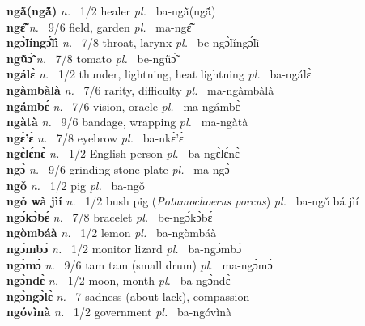 \noindent
{\bfseries ngã̀(ngã̀́)}  {\itshape n.~} 1/2 healer {\itshape pl.~} ba-ngã̀(ngã́)    \\ 
{\bfseries ngɛ̃̂}  {\itshape n.~} 9/6 field, garden {\itshape pl.~} ma-ngɛ̃̂    \\ 
{\bfseries ngɔ̃̀língɔ̃̂́lì}  {\itshape n.~} 7/8 throat, larynx {\itshape pl.~} be-ngɔ̃̀língɔ̃́lì    \\ 
{\bfseries ngũ̀ɔ̃̀}  {\itshape n.~} 7/8 tomato {\itshape pl.~} be-ngũ̀ɔ̃̀    \\ 
{\bfseries ngálɛ̀}  {\itshape n.~} 1/2 thunder, lightning, heat lightning {\itshape pl.~} ba-ngálɛ̀    \\ 
{\bfseries  ngàmbàlà}  {\itshape n.~} 7/6 rarity, difficulty {\itshape pl.~} ma-ngàmbàlà    \\ 
{\bfseries ngámbɛ́}  {\itshape n.~} 7/6 vision, oracle {\itshape pl.~} ma-ngámbɛ̀    \\ 
{\bfseries ngàtà}  {\itshape n.~} 9/6 bandage, wrapping  {\itshape pl.~} ma-ngàtà    \\ 
{\bfseries ngɛ̀'ɛ̀}  {\itshape n.~} 7/8 eyebrow {\itshape pl.~} ba-nkɛ̀'ɛ̀    \\ 
{\bfseries ngɛ̀lɛ́nɛ̀}  {\itshape n.~} 1/2 English person {\itshape pl.~} ba-ngɛ̀lɛ́nɛ̀    \\ 
{\bfseries ngɔ̀}  {\itshape n.~} 9/6 grinding stone plate {\itshape pl.~} ma-ngɔ̀    \\ 
{\bfseries ngǒ}  {\itshape n.~} 1/2 pig {\itshape pl.~} ba-ngǒ    \\ 
{\bfseries ngǒ wà jìí}  {\itshape n.~} 1/2 bush pig ({\itshape Potamochoerus porcus}) {\itshape pl.~} ba-ngǒ bá jìí    \\ 
{\bfseries ngɔ́kɔ̀bɛ́}  {\itshape n.~} 7/8 bracelet {\itshape pl.~} be-ngɔ́kɔ̀bɛ́    \\ 
{\bfseries ngòmbáà}  {\itshape n.~} 1/2 lemon {\itshape pl.~} ba-ngòmbáà    \\ 
{\bfseries ngɔ̀mbɔ̀}  {\itshape n.~} 1/2 monitor lizard {\itshape pl.~} ba-ngɔ̀mbɔ̀    \\ 
{\bfseries ngɔ̀mɔ̀}  {\itshape n.~} 9/6 tam tam (small drum) {\itshape pl.~} ma-ngɔ̀mɔ̀    \\ 
{\bfseries ngɔ̀ndɛ̀}  {\itshape n.~} 1/2 moon, month {\itshape pl.~} ba-ngɔ̀ndɛ̀    \\ 
{\bfseries ngɔ̀ngɔ̀lɛ̀}  {\itshape n.~} 7 sadness (about lack), compassion    \\ 
{\bfseries ngóvìnà}  {\itshape n.~} 1/2 government {\itshape pl.~} ba-ngóvìnà    \\ 
